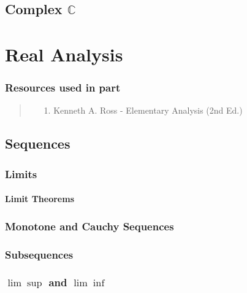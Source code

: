 \documentclass[12pt, english]{book}
\newenvironment{partintro}
{\vspace*{\fill}
	\section*{\centering Resources used in part \thepart}
	\begin{quotation}}
	{\end{quotation}\vspace*{\fill}\newpage}
\begin{document}
	\chapter{Complex $\mathbb{C}$} \label{Complex Chapter - Numbers}
	

	
	\part{Real Analysis} \label{Real Analysis Part}
	\begin{partintro}
		\begin{itemize}
			\item[1.] Kenneth A. Ross - Elementary Analysis (2nd Ed.) \cite{Ross.K-Elementary-Analysis-2013}
		\end{itemize}
	\end{partintro}

	\chapter{Sequences} \label{Sequences Chapter - Real Analysis}
	
	\section{Limits} \label{Limits Section - Real Analysis}
	
	\subsection{Limit Theorems} \label{Limit Theorems Subsection - Real Analysis}
	
	\section{Monotone and Cauchy Sequences} \label{Monotone and Cauchy Sequences Section - Real Analysis}
	
	\section{Subsequences} \label{Subsequences Section - Real Analysis}
	
	\section{$\lim \operatorname{sup}$ and $\lim \operatorname{inf}$} \label{lim sup and lim inf Section - Real Analysis}
	
\end{document}
